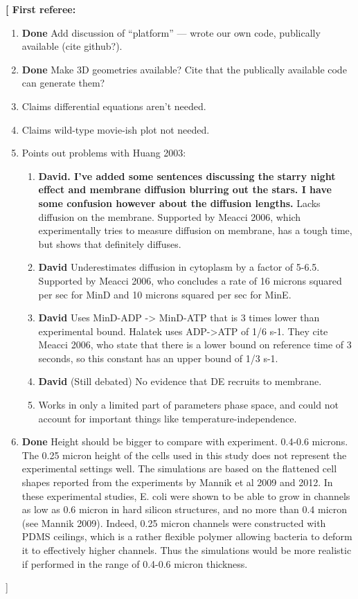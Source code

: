 \documentclass[10pt,letterpaper]{article}
\newcommand{\fixme}[1]{\red{[#1]}}
\newcommand{\red}[1]{{\bf \color{red} #1}}
\newcommand{\blue}[1]{{\bf \color{blue} #1}}
\begin{document}
\fixme{
  First referee:
  \begin{enumerate}
  \item \blue{Done} Add discussion of ``platform'' --- wrote our own code,
    publically available (cite github?).
  \item \blue{Done} Make 3D geometries available? Cite that the publically
    available code can generate them?
  \item Claims differential equations aren't needed.
  \item Claims wild-type movie-ish plot not needed.
  \item Points out problems with Huang 2003:
    \begin{enumerate}
    \item \blue{David.  I've added some sentences discussing the
      starry night effect and membrane diffusion blurring out the
      stars.  I have some confusion however about the diffusion
      lengths.}  Lacks diffusion on the membrane. Supported by Meacci
      2006, which experimentally tries to measure diffusion on
      membrane, has a tough time, but shows that definitely diffuses.
    \item \blue{David} Underestimates diffusion in cytoplasm by a factor of 5-6.5.
      Supported by Meacci 2006, who concludes a rate of 16 microns
      squared per sec for MinD and 10 microns squared per sec for
      MinE.
    \item \blue{David} Uses MinD-ADP -> MinD-ATP that is 3 times lower than
      experimental bound. Halatek uses ADP->ATP of 1/6 s-1. They cite
      Meacci 2006, who state that there is a lower bound on reference
      time of 3 seconds, so this constant has an upper bound of 1/3
      s-1.
    \item \blue{David} (Still debated) No evidence that DE recruits to membrane.
    \item Works in only a limited part of parameters phase space, and
      could not account for important things like
      temperature-independence.
    \end{enumerate}
  \item \blue{Done} Height should be bigger to compare with experiment.  0.4-0.6
    microns.  The 0.25 micron height of the cells used in this study
    does not represent the experimental settings well. The simulations
    are based on the flattened cell shapes reported from the
    experiments by Mannik et al 2009 and 2012. In these experimental
    studies, E. coli were shown to be able to grow in channels as low
    as 0.6 micron in hard silicon structures, and no more than 0.4
    micron (see Mannik 2009). Indeed, 0.25 micron channels were
    constructed with PDMS ceilings, which is a rather flexible polymer
    allowing bacteria to deform it to effectively higher
    channels. Thus the simulations would be more realistic if
    performed in the range of 0.4-0.6 micron thickness.


\end{enumerate}}
\end{document}
